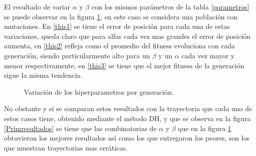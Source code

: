 \documentclass[12pt]{article}
\begin{document}
El resultado de variar $\alpha$ y $\beta$ con los mismos parámetros de la tabla \ref{parametros} se puede observar en la figura \ref{muchas}, en este caso se considera una población con mutaciones. En \ref{this1} se tiene el error de posición para cada una de estas variaciones, queda claro que para alfas cada vez mas grandes el error de posición aumenta, en \ref{this2} refleja como el promedio del fitness evoluciona con cada generación, siendo particularmente alto para un $\beta$ y un $\alpha$ cada vez mayor y menor respectivamente, en \ref{this3} se tiene que el mejor fitness de la generación sigue la misma tendencia.

\begin{figure}
\centering
{}
\caption{Variación de los hiperparametros por generación.}
\label{muchas}
\end{figure}

No obstante y si se comparan estos resultados con la trayectoria que cada uno de estos casos tiene, obtenido mediante el método DH, y que se observa en la figura \ref{Primresultados} se tiene que las combinatorias de  $\alpha$ y $\beta$ que en la figura \ref{muchas} obtuvieron los mejores resultados así como los que entregaron los peores, son los que muestran trayectorias mas erráticas.
\end{document}
